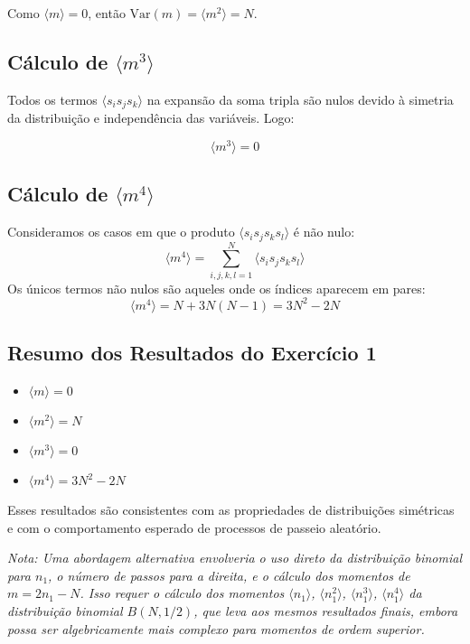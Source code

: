 \documentclass[12pt]{article}
\begin{document}
Como $\langle m \rangle = 0$, então $\text{Var}(m) = \langle m^2 \rangle = N$.

\subsection*{Cálculo de $\langle m^3 \rangle$}

Todos os termos $\langle s_i s_j s_k \rangle$ na expansão da soma tripla são nulos devido à simetria da distribuição e independência das variáveis. Logo:

\[
\langle m^3 \rangle = 0
\]

\subsection*{Cálculo de $\langle m^4 \rangle$}

Consideramos os casos em que o produto $\langle s_i s_j s_k s_l \rangle$ é não nulo:
\[
\langle m^4 \rangle = \sum_{i,j,k,l=1}^{N} \langle s_i s_j s_k s_l \rangle
\]
Os únicos termos não nulos são aqueles onde os índices aparecem em pares:
\[
\langle m^4 \rangle = N + 3N(N - 1) = 3N^2 - 2N
\]

\subsection*{Resumo dos Resultados do Exercício 1}

\begin{itemize}
    \item $\langle m \rangle = 0$
    \item $\langle m^2 \rangle = N$
    \item $\langle m^3 \rangle = 0$
    \item $\langle m^4 \rangle = 3N^2 - 2N$
\end{itemize}

Esses resultados são consistentes com as propriedades de distribuições simétricas e com o comportamento esperado de processos de passeio aleatório.

\vspace{1em}
\textit{Nota: Uma abordagem alternativa envolveria o uso direto da distribuição binomial para $n_1$, o número de passos para a direita, e o cálculo dos momentos de $m = 2n_1 - N$. Isso requer o cálculo dos momentos $\langle n_1 \rangle$, $\langle n_1^2 \rangle$, $\langle n_1^3 \rangle$, $\langle n_1^4 \rangle$ da distribuição binomial $B(N, 1/2)$, que leva aos mesmos resultados finais, embora possa ser algebricamente mais complexo para momentos de ordem superior.}
\end{document}
